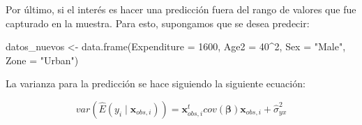 \documentclass[
  12pt,
]{book}
\newenvironment{Shaded}{\begin{snugshade}}{\end{snugshade}}
\newcommand{\AttributeTok}[1]{\textcolor[rgb]{0.77,0.63,0.00}{#1}}
\newcommand{\DecValTok}[1]{\textcolor[rgb]{0.00,0.00,0.81}{#1}}
\newcommand{\FloatTok}[1]{\textcolor[rgb]{0.00,0.00,0.81}{#1}}
\newcommand{\FunctionTok}[1]{\textcolor[rgb]{0.00,0.00,0.00}{#1}}
\newcommand{\NormalTok}[1]{#1}
\newcommand{\OtherTok}[1]{\textcolor[rgb]{0.56,0.35,0.01}{#1}}
\newcommand{\SpecialCharTok}[1]{\textcolor[rgb]{0.00,0.00,0.00}{#1}}
\newcommand{\StringTok}[1]{\textcolor[rgb]{0.31,0.60,0.02}{#1}}
\begin{document}
\begin{Shaded}
\end{Shaded}

Por último, si el interés es hacer una predicción fuera del rango de valores que fue capturado en la muestra. Para esto, supongamos que se desea predecir:

\begin{Shaded}
\begin{Highlighting}[]
\NormalTok{datos\_nuevos }\OtherTok{\textless{}{-}} \FunctionTok{data.frame}\NormalTok{(}\AttributeTok{Expenditure =} \DecValTok{1600}\NormalTok{, }
                           \AttributeTok{Age2 =} \DecValTok{40}\SpecialCharTok{\^{}}\DecValTok{2}\NormalTok{, }\AttributeTok{Sex =} \StringTok{"Male"}\NormalTok{, }
                           \AttributeTok{Zone =} \StringTok{"Urban"}\NormalTok{)}
\end{Highlighting}
\end{Shaded}

La varianza para la predicción se hace siguiendo la siguiente ecuación:

\[
var\left(\hat{E}\left(y_{i}\mid\boldsymbol{x}_{obs,i}\right)\right)=\boldsymbol{x}_{obs,i}^{t}cov\left(\boldsymbol{\beta}\right)\boldsymbol{x}_{obs,i} + \hat{\sigma}^2_{yx}
\]
\end{document}

